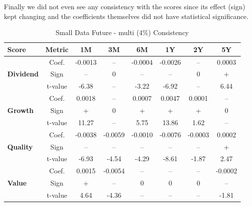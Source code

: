 \documentclass[11pt,english,a4paper,hidelinks]{book}
\begin{document}
\noindent Finally we did not even see any consistency with the scores since its effect (sign) kept changing and the coefficients themselves did not have statistical significance.

\begin{table}[H]
    \centering
    \begin{tabular}{lccccccc}
        \toprule
        \textbf{Score} & \textbf{Metric} & \textbf{1M} & \textbf{3M} & \textbf{6M} & \textbf{1Y} & \textbf{2Y} & \textbf{5Y} \\
        \midrule
        \multirow{3}{*}{\textbf{Dividend}} 
            & Coef.   & -0.0013 & --      & -0.0004 & -0.0026 & --      & 0.0003 \\
            & Sign    & --      & 0       & --      & --      & 0       & +      \\
            & t-value & -6.38   & --      & -3.22   & -6.92   & --      & 6.44   \\
        \midrule
        \multirow{3}{*}{\textbf{Growth}} 
            & Coef.   & 0.0018  & --      & 0.0007  & 0.0047  & 0.0001  & --     \\
            & Sign    & +       & 0       & +       & +       & +       & 0      \\
            & t-value & 11.27   & --      & 5.75    & 13.86   & 1.62    & --     \\
        \midrule
        \multirow{3}{*}{\textbf{Quality}} 
            & Coef.   & -0.0038 & -0.0059 & -0.0010 & -0.0076 & -0.0003 & 0.0002 \\
            & Sign    & --      & --      & --      & --      & --      & +      \\
            & t-value & -6.93   & -4.54   & -4.29   & -8.61   & -1.87   & 2.47   \\
        \midrule
        \multirow{3}{*}{\textbf{Value}} 
            & Coef.   & 0.0015  & -0.0054 & --      & --      & --      & -0.0002 \\
            & Sign    & +       & --      & 0       & 0       & 0       & --      \\
            & t-value & 4.64    & -4.36   & --      & --      & --      & -1.81   \\
        \bottomrule
    \end{tabular}
    \caption{Small Data Future - \acrshort{multi} (4\%) Consistency}
    \label{tab:first_linear_regression_results_scores}
\end{table}

\newpage
\end{document}
